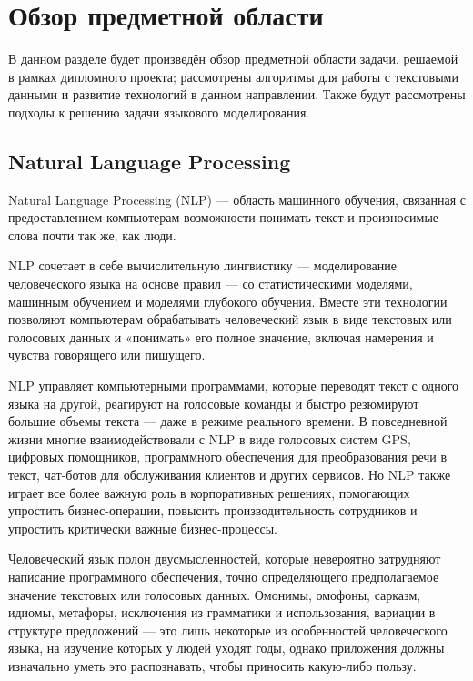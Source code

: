 \section{Обзор предметной области}
\label{sec:domain}

В данном разделе будет произведён обзор предметной области задачи, решаемой в рамках дипломного проекта; рассмотрены алгоритмы для работы с текстовыми данными и развитие технологий в данном направлении. Также будут рассмотрены подходы к решению задачи языкового моделирования.

\subsection{Natural Language Processing}
\label{sub:domain:nlp}

Natural Language Processing (NLP) --- область машинного обучения, связанная с предоставлением компьютерам возможности понимать текст и произносимые слова почти так же, как люди.

NLP сочетает в себе вычислительную лингвистику — моделирование человеческого языка на основе правил — со статистическими моделями, машинным обучением и моделями глубокого обучения. Вместе эти технологии позволяют компьютерам обрабатывать человеческий язык в виде текстовых или голосовых данных и «понимать» его полное значение, включая намерения и чувства говорящего или пишущего.

NLP управляет компьютерными программами, которые переводят текст с одного языка на другой, реагируют на голосовые команды и быстро резюмируют большие объемы текста — даже в режиме реального времени. В повседневной жизни многие взаимодействовали с NLP в виде голосовых систем GPS, цифровых помощников, программного обеспечения для преобразования речи в текст, чат-ботов для обслуживания клиентов и других сервисов. Но NLP также играет все более важную роль в корпоративных решениях, помогающих упростить бизнес-операции, повысить производительность сотрудников и упростить критически важные бизнес-процессы.

Человеческий язык полон двусмысленностей, которые невероятно затрудняют написание программного обеспечения, точно определяющего предполагаемое значение текстовых или голосовых данных. Омонимы, омофоны, сарказм, идиомы, метафоры, исключения из грамматики и использования, вариации в структуре предложений — это лишь некоторые из особенностей человеческого языка, на изучение которых у людей уходят годы, однако приложения должны изначально уметь это распознавать, чтобы приносить какую-либо пользу.

